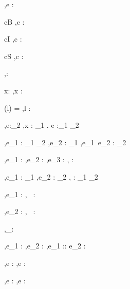 




  {\Gamma,\Sigma \infers e : \tau}


  {c\in B}
  {\Gamma,\Sigma \infers c : \Bool}

  {c\in I}
  {\Gamma,\Sigma \infers c : \Int}

  {c\in S}
  {\Gamma,\Sigma \infers c : \String}


  { }
  {\Gamma,\Sigma \infers \unit : \Unit}


  {x:\tau\in\Gamma}
  {\Gamma,\Sigma \infers x : \tau}

  {\Sigma(l) = \beta}
  {\Gamma,\Sigma \infers l : \Reference \beta}


  {\Gamma[x:\tau_1] ,\Sigma \infers e:\tau_2}
  {\Gamma,\Sigma \infers \lambda x : \tau_1 . e :\tau_1 \to \tau_2}

  {\Gamma,\Sigma \infers e_1 : \tau_1 \to \tau_2 \Quad
   \Gamma,\Sigma \infers e_2 : \tau_1}
  {\Gamma,\Sigma \infers e_1\ e_2 : \tau_2}


  {\Gamma,\Sigma \infers e_1 : \Bool \Quad
   \Gamma,\Sigma \infers e_2 : \tau \Quad
   \Gamma,\Sigma \infers e_3 : \tau}
  {\Gamma,\Sigma \infers {} : \tau}


    {\Gamma,\Sigma \infers e_1 : \tau_1  \Quad
     \Gamma,\Sigma \infers e_2 : \tau_2}
    {\Gamma,\Sigma \infers {} : \tau_1 \times \tau_2}

  {\Gamma,\Sigma \infers e_1 : \tau}
  {\Gamma,\Sigma \infers \Fst\  : \tau}

    {\Gamma,\Sigma \infers e_2 : \tau}
    {\Gamma,\Sigma \infers \Snd\  : \tau}


  { }
  {\Gamma,\Sigma \infers [\ ]_\tau : \List \tau}

  {\Gamma,\Sigma \infers e_1 : \tau \Quad
   \Gamma,\Sigma \infers e_2 : \List \tau}
  {\Gamma,\Sigma \infers e_1 :: e_2 : \List \tau}

  {\Gamma,\Sigma \infers e : \List\tau}
  {\Gamma,\Sigma \infers \Head e : \tau}

    {\Gamma,\Sigma \infers e : \List\tau}
    {\Gamma,\Sigma \infers \Tail e : \List\tau}


